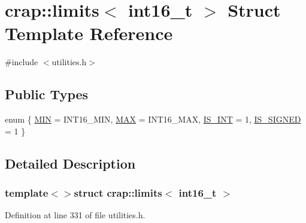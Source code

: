 \hypertarget{structcrap_1_1limits_3_01int16__t_01_4}{\section{crap\+:\+:limits$<$ int16\+\_\+t $>$ Struct Template Reference}
\label{structcrap_1_1limits_3_01int16__t_01_4}
}


{\ttfamily \#include $<$utilities.\+h$>$}

\subsection*{Public Types}
\begin{DoxyCompactItemize}
\item 
enum \{ \hyperlink{structcrap_1_1limits_3_01int16__t_01_4_a97ebcf5c0399ee91cbd52333b3fc9335a1de03cf78457841a6f3c7480dfad60a2}{M\+I\+N} = I\+N\+T16\+\_\+\+M\+I\+N, 
\hyperlink{structcrap_1_1limits_3_01int16__t_01_4_a97ebcf5c0399ee91cbd52333b3fc9335aed380ff9e38962978a1ed0e3dbb287e8}{M\+A\+X} = I\+N\+T16\+\_\+\+M\+A\+X, 
\hyperlink{structcrap_1_1limits_3_01int16__t_01_4_a97ebcf5c0399ee91cbd52333b3fc9335a075153b3e346cc6ed4d750497e392942}{I\+S\+\_\+\+I\+N\+T} = 1, 
\hyperlink{structcrap_1_1limits_3_01int16__t_01_4_a97ebcf5c0399ee91cbd52333b3fc9335a245868bae7493a2fa5764af28a1ffc3d}{I\+S\+\_\+\+S\+I\+G\+N\+E\+D} = 1
 \}
\end{DoxyCompactItemize}


\subsection{Detailed Description}
\subsubsection*{template$<$$>$struct crap\+::limits$<$ int16\+\_\+t $>$}



Definition at line 331 of file utilities.\+h.



